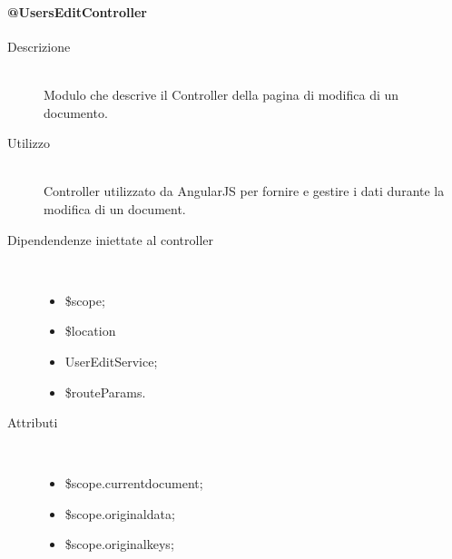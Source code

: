 \paragraph{@UsersEditController}
\begin{description}
 \item[Descrizione] \hfill \\
 Modulo che descrive il Controller della pagina di modifica di un documento.
 
 \item[Utilizzo] \hfill \\
 Controller utilizzato da AngularJS per fornire e gestire i dati durante la modifica di un document.
 
 \item[Dipendendenze iniettate al controller] \hfill \\
 \begin{itemize}
  \item \$scope;
  \item \$location
  \item UserEditService;
  \item \$routeParams.
  
 \end{itemize}
 
 \item[Attributi] \hfill \\
 \begin{itemize}
    \item  \$scope.current\textunderscore document;
    \item  \$scope.original\textunderscore data;
    \item  \$scope.original\textunderscore keys;
 \end{itemize}
 

\end{description}
